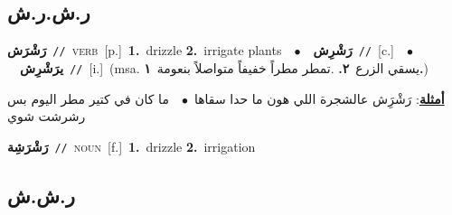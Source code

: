 \documentclass[10pt,a4paper,twoside]{article} %
\begin{document}
\begin{multicols}{2}
\vspace{-3mm}
\subsection*{\color{blue}\foreignlanguage{arabic}{ر.ش.ر.ش}\color{blue}{}} 

{\setlength\topsep{0pt}\textbf{\foreignlanguage{arabic}{رَشْرَش}}\ {\color{gray}\texttt{//}\color{black}}\ \textsc{verb}\ [p.]\ \textbf{1.}~drizzle  \textbf{2.}~irrigate plants\ \ $\bullet$\ \ \setlength\topsep{0pt}\textbf{\foreignlanguage{arabic}{رَشْرِش}}\ {\color{gray}\texttt{//}\color{black}}\ [c.]\ \ $\bullet$\ \ \setlength\topsep{0pt}\textbf{\foreignlanguage{arabic}{يرَشْرِش}}\ {\color{gray}\texttt{//}\color{black}}\ [i.]\ \color{gray}(msa. \foreignlanguage{arabic}{يسقي الزرع}~\foreignlanguage{arabic}{\textbf{٢.}}  .\foreignlanguage{arabic}{تمطر مطراً خفيفاً متواصلاً بنعومة}~\foreignlanguage{arabic}{\textbf{١.}})\color{black}\  \begin{flushright}\color{gray}\foreignlanguage{arabic}{\textbf{\underline{\foreignlanguage{arabic}{أمثلة}}}: رَشْرَِش عالشجرة اللي هون ما حدا سقاها\ $\bullet$\ \  ما كان في كتير مطر اليوم بس رشرشت شوي}\end{flushright}\color{black}} \vspace{2mm}

{\setlength\topsep{0pt}\textbf{\foreignlanguage{arabic}{رَشْرَشِة}}\ {\color{gray}\texttt{//}\color{black}}\ \textsc{noun}\ [f.]\ \textbf{1.}~drizzle  \textbf{2.}~irrigation\ } \vspace{2mm}

\vspace{-3mm}
\subsection*{\color{blue}\foreignlanguage{arabic}{ر.ش.ش}\color{blue}{}} 


\end{multicols}
\end{document}
